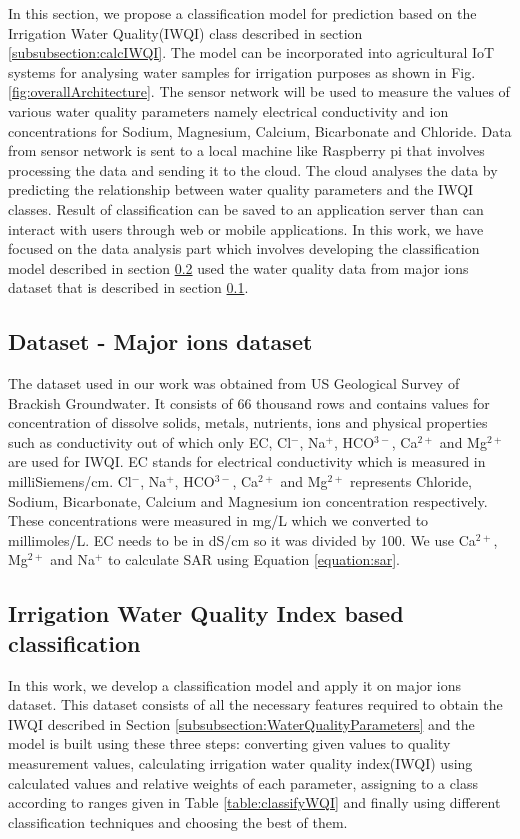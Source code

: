 \documentclass[conference]{IEEEtran}
\begin{document}
In this section, we propose a classification model for prediction based on the Irrigation Water Quality(IWQI) class described in section \ref{subsubsection:calcIWQI}. The model can be incorporated into agricultural IoT systems for analysing water samples for irrigation purposes as shown in Fig. \ref{fig:overallArchitecture}. The sensor network will be used to measure the values of various water quality parameters namely electrical conductivity and ion concentrations for Sodium, Magnesium, Calcium, Bicarbonate and Chloride. Data from sensor network is sent to a local machine like Raspberry pi that involves processing the data and sending it to the cloud. The cloud analyses the data by predicting the relationship between water quality parameters and the IWQI classes. Result of classification can be saved to an application server than can interact with users through web or mobile applications. In this work, we have focused on the data analysis part which involves developing the classification model described in section \ref{subsection:iwqiClassification} used the water quality data from major ions dataset \cite{dataset:majorIons} that is described in section \ref{subsection:datasets}.    


\subsection{Dataset - Major ions dataset}
\label{subsection:datasets}
The dataset used in our work was obtained from US Geological Survey of Brackish Groundwater\cite{dataset:majorIons}. It consists of 66 thousand rows and contains values for concentration of dissolve solids, metals, nutrients, ions and physical properties such as conductivity out of which only EC, Cl$^-$, Na$^+$, HCO$^{3-}$, Ca$^{2+}$ and Mg$^{2+}$ are used for IWQI. EC stands for electrical conductivity which is measured in milliSiemens/cm. Cl$^-$, Na$^+$, HCO$^{3-}$, Ca$^{2+}$ and Mg$^{2+}$ represents  Chloride, Sodium, Bicarbonate, Calcium and Magnesium ion concentration respectively. These concentrations were measured in mg/L which we converted to millimoles/L. EC needs to be in dS/cm so it was divided by 100. We use Ca$^{2+}$, Mg$^{2+}$ and Na$^+$ to calculate SAR using Equation \ref{equation:sar}.


\subsection{Irrigation Water Quality Index based classification}
\label{subsection:iwqiClassification}
In this work, we develop a classification model and apply it on major ions dataset. This dataset consists of all the necessary features required to obtain the IWQI described in Section \ref{subsubsection:WaterQualityParameters} and the model is built using these three steps: converting given values to quality measurement values, calculating irrigation water quality index(IWQI) using calculated values and relative weights of each parameter, assigning to a class according to ranges given in Table \ref{table:classifyWQI} and finally using different classification techniques and choosing the best of them.
\end{document}
